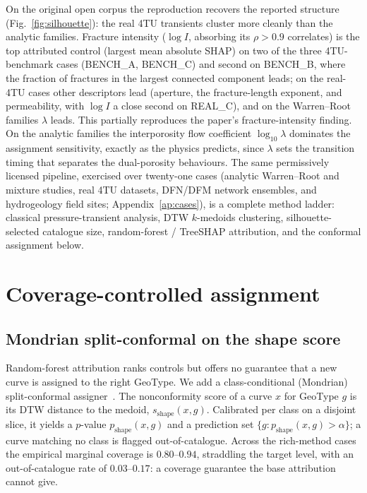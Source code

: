 \documentclass[journal]{IEEEtran}
\begin{document}
On the original open corpus the reproduction recovers the reported structure
(Fig.~\ref{fig:silhouette}): the real 4TU transients cluster more cleanly than the analytic
families. Fracture intensity ($\log I$, absorbing its $\rho\!>\!0.9$ correlates) is the top
attributed control (largest mean absolute SHAP) on two of the three 4TU-benchmark cases (BENCH\_A,
BENCH\_C) and second on BENCH\_B, where the fraction of fractures in the largest connected component
leads; on the real-4TU cases other descriptors lead (aperture, the fracture-length exponent, and
permeability, with $\log I$ a close second on REAL\_C), and on the Warren--Root families $\lambda$
leads. This partially reproduces the paper's fracture-intensity finding.
On the analytic families the interporosity flow coefficient $\log_{10}\lambda$ dominates the
assignment sensitivity, exactly as the physics predicts, since $\lambda$ sets the transition timing
that separates the dual-porosity behaviours. The same permissively licensed pipeline, exercised over
twenty-one cases (analytic Warren--Root and mixture studies, real 4TU datasets, DFN/DFM
network ensembles, and hydrogeology field sites; Appendix~\ref{ap:cases}), is a complete method
ladder: classical pressure-transient analysis, DTW $k$-medoids clustering, silhouette-selected
catalogue size, random-forest / TreeSHAP attribution, and the conformal assignment below.

\section{Coverage-controlled assignment}
\label{sec:conformal}

\subsection{Mondrian split-conformal on the shape score}

Random-forest attribution ranks controls but offers no guarantee that a new curve is assigned to
the right GeoType. We add a class-conditional (Mondrian) split-conformal
assigner~\cite{vovk2005,angelopoulos2023}. The nonconformity score of a curve $x$ for GeoType $g$
is its DTW distance to the medoid, $s_\text{shape}(x,g)$. Calibrated per class on a disjoint slice,
it yields a $p$-value $p_\text{shape}(x,g)$ and a prediction set
$\{g:p_\text{shape}(x,g)>\alpha\}$; a curve matching no class is flagged out-of-catalogue. Across
the rich-method cases the empirical marginal coverage is $0.80$--$0.94$, straddling the target level, with an
out-of-catalogue rate of $0.03$--$0.17$: a coverage guarantee the base attribution cannot give.
\end{document}
